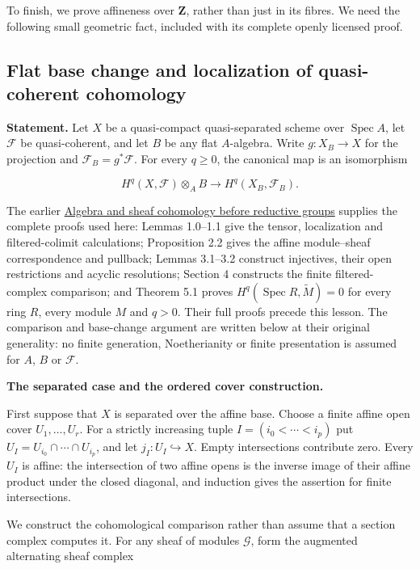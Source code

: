 \documentclass[11pt,a4paper,openany]{report}
\begin{document}
To finish, we prove affineness over \(\mathbf Z\), rather than just in its fibres. We need the following small geometric fact, included with its complete openly licensed proof.

\subsection{Flat base change and localization of quasi-coherent cohomology}\label{AG-RG-05-flat-base-change-and-localization-of-quasi-coherent-cohomology}

\textbf{Statement.} Let \(X\) be a quasi-compact quasi-separated scheme over \(\operatorname{Spec}A\), let \(\mathcal F\) be quasi-coherent, and let \(B\) be any flat \(A\)-algebra. Write \(g:X_B\to X\) for the projection and \(\mathcal F_B=g^*\mathcal F\). For every \(q\geq0\), the canonical map is an isomorphism

\[
H^q(X,\mathcal F)\otimes_A B
\longrightarrow H^q(X_B,\mathcal F_B).
\]

The earlier \href{AG-RG-S01.html}{Algebra and sheaf cohomology before reductive groups} supplies the complete proofs used here: Lemmas 1.0--1.1 give the tensor, localization and filtered-colimit calculations; Proposition 2.2 gives the affine module--sheaf correspondence and pullback; Lemmas 3.1--3.2 construct injectives, their open restrictions and acyclic resolutions; Section 4 constructs the finite filtered-complex comparison; and Theorem 5.1 proves \(H^q(\operatorname{Spec}R,\widetilde M)=0\) for every ring \(R\), every module \(M\) and \(q>0\). Their full proofs precede this lesson. The comparison and base-change argument are written below at their original generality: no finite generation, Noetherianity or finite presentation is assumed for \(A\), \(B\) or \(\mathcal F\).

\textbf{The separated case and the ordered cover construction.}

First suppose that \(X\) is separated over the affine base. Choose a finite affine open cover \(U_1,\ldots,U_r\). For a strictly increasing tuple \(I=(i_0<\cdots<i_p)\) put \(U_I=U_{i_0}\cap\cdots\cap U_{i_p}\), and let \(j_I:U_I\hookrightarrow X\). Empty intersections contribute zero. Every \(U_I\) is affine: the intersection of two affine opens is the inverse image of their affine product under the closed diagonal, and induction gives the assertion for finite intersections.

We construct the cohomological comparison rather than assume that a section complex computes it. For any sheaf of modules \(\mathcal G\), form the augmented alternating sheaf complex
\end{document}
